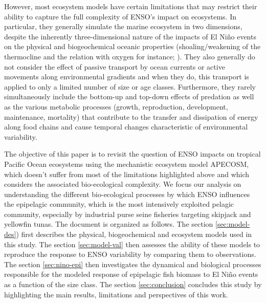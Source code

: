 However, most ecosystem models have certain limitations that may restrict their ability to capture the full complexity of ENSO's impact on ecosystems. In particular, they generally simulate the marine ecosystem in two dimensions, despite the  inherently three-dimensional nature of the impacts of El Niño events on the physical and biogeochemical oceanic properties  (shoaling/weakening of the thermocline and the relation with oxygen for instance; \citealp{leungENSODrivesNearsurface2019}). They also generally do not consider the effect of passive transport by ocean currents or active movements along environmental gradients and when they do, this transport is applied  to only a limited number of size or age classes. Furthermore, they rarely simultaneously include  the bottom-up and top-down effects of predation as well as the various metabolic processes (growth, reproduction, development, maintenance, mortality) that contribute to the transfer and dissipation of energy along food chains and cause temporal changes characteristic of environmental variability. 

The objective of this paper is to revisit the question of ENSO impacts on tropical Pacific Ocean ecosystems using the mechanistic ecosystem model APECOSM, which doesn't suffer from most of the limitations highlighted above and which considers the associated bio-ecological complexity. We focus our analysis on understanding the different bio-ecological processes by which ENSO influences the epipelagic community, which is  the most intensively exploited pelagic community, especially by industrial purse seine fisheries targeting skipjack and yellowfin tunas. The document is organized as follows. The section \ref{sec:model-des}) first describes the physical, biogeochemical and ecosystem models used in this study. The section \ref{sec:model-val} then assesses the ability of these models to reproduce the response to ENSO variability by comparing them to observations. The section \ref{sec:nino-epi} then investigates the dynamical and biological processes responsible for the modeled response of epipelagic fish biomass to El Niño events as a function of the size class. The section \ref{sec:conclusion} concludes this study by highlighting the main results, limitations and perspectives of this work.

